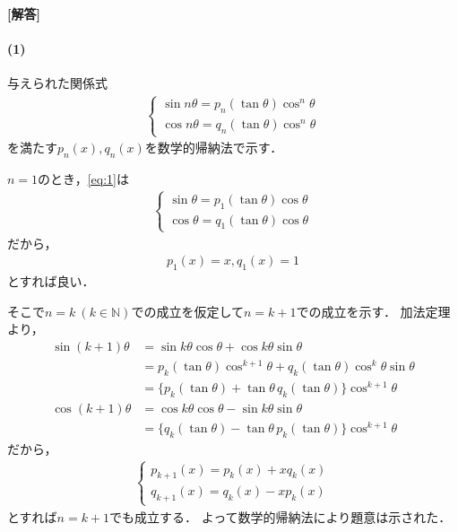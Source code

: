 \documentclass[../../main.tex]{subfiles}
\begin{document}
\begin{oframed}
  
\end{oframed}

{\bf [解答]}

\paragraph{(1)}

与えられた関係式
\begin{align}
  \begin{cases}
    \sin n\theta=p_n(\tan\theta)\cos^n\theta \\
    \cos n\theta=q_n(\tan\theta)\cos^n\theta
  \end{cases} \label{eq:1}
\end{align}
を満たす$p_n(x),q_n(x)$を数学的帰納法で示す．

$n=1$のとき，\cref{eq:1}は
\begin{align}
  \begin{cases}
    \sin \theta = p_1(\tan\theta)\cos\theta \\
    \cos \theta = q_1(\tan\theta)\cos\theta
  \end{cases}
\end{align}
だから，
\begin{align}
  p_1(x)=x, q_1(x)=1 \label{eq:2}
\end{align}
とすれば良い．

そこで$n=k \ (k\in\mathbb{N})$での成立を仮定して$n=k+1$での成立を示す．
加法定理より，
\begin{align}
  \sin(k+1)\theta
  &=\sin k\theta\cos\theta+\cos k\theta\sin\theta\\
  &=p_k(\tan\theta)\cos^{k+1}\theta +q_k(\tan\theta)\cos^k\theta\sin\theta\\
  &=\bigl\{p_k(\tan\theta)+\tan\theta\,q_k(\tan\theta)\bigr\} \cos^{k+1}\theta \\
  \cos(k+1)\theta
  &=\cos k\theta\cos\theta-\sin k\theta\sin\theta\\
  &=\bigl\{q_k(\tan\theta)-\tan\theta\,p_k(\tan\theta)\bigr\}\cos^{k+1}\theta
\end{align}
だから，
\begin{align}
  \begin{cases}
    p_{k+1}(x)=p_k(x)+xq_k(x)\\
    q_{k+1}(x)=q_k(x)-xp_k(x)
  \end{cases} \label{eq:3}
\end{align}
とすれば$n=k+1$でも成立する．
よって数学的帰納法により題意は示された．
\end{document}
